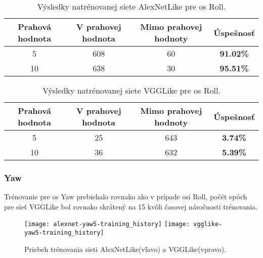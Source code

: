 \begin{table}[H]
    \centering
    \begin{tabular}{|c|c|c|c|}
        \hline
        Prahová hodnota & V prahovej hodnota       & Mimo prahovej hodnoty    & Úspešnosť    \\ \hline
        5               & {\color[HTML]{009901} 608} & {\color[HTML]{9A0000} 60} & \textbf{91.02\%} \\ \hline
        10              & {\color[HTML]{009901} 638} & {\color[HTML]{9A0000} 30} & \textbf{95.51\%} \\ \hline
    \end{tabular}
    \caption{Výsledky natrénovanej siete AlexNetLike pre os Roll.}
    \label{tab:alexnetrollresults}
\end{table}
\begin{table}[H]
    \centering
    \begin{tabular}{|c|c|c|c|}
        \hline
        Prahová hodnota & V prahovej hodnota       & Mimo prahovej hodnoty    & Úspešnosť    \\ \hline
        5               & {\color[HTML]{009901} 25} & {\color[HTML]{9A0000} 643} & \textbf{3.74\%} \\ \hline
        10              & {\color[HTML]{009901} 36} & {\color[HTML]{9A0000} 632} & \textbf{5.39\%} \\ \hline
    \end{tabular}
    \caption{Výsledky natrénovanej siete VGGLike pre os Roll.}
    \label{tab:vgglikerollresults}
\end{table}


\subsubsection{Yaw}
Trénovanie pre os Yaw prebiehalo rovnako ako v prípade osi Roll, počét epóch pre sieť VGGLike
    bol rovnako skrátený na 15 kvôli časovej náročnosti trénovania.

\begin{figure}[H]
    \centering
    \texttt{[image: alexnet-yaw5-training\_history]}
	\texttt{[image: vgglike-yaw5-training\_history]}
	\caption{Priebeh trénovania sieti AlexNetLike(vľavo) a VGGLike(vpravo).}
	\label{pic:yawaxis}
\end{figure}

